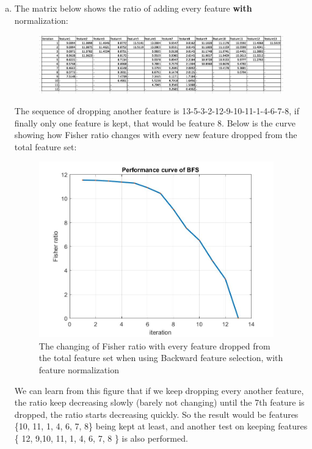 \documentclass[a4paper]{article}
\begin{document}
\begin{spacing}{2.0}
\begin{enumerate}[(1)]
\begin{itemize}
\begin{enumerate}[(a)]
\item \large{The matrix below shows the ratio of adding every feature \textbf{with} normalization:}
\normalsize
\begin{figure}[H]
\centering
\includegraphics[width = 7.5in]{NormalizetableBFS.jpg}
\label{BFSnorm}
\end{figure}

The sequence of dropping another feature is 13-5-3-2-12-9-10-11-1-4-6-7-8, if finally only one feature is kept, that would be feature 8.
Below is the curve showing how Fisher ratio changes with every new feature dropped from the total feature set:
\begin{figure}[H]
\centering
\includegraphics[width = 4in]{BFSnorm.jpg}
\caption{The changing of Fisher ratio with every feature dropped from the total feature set when using Backward feature selection, with feature normalization}
\end{figure}

We can learn from this figure that if we keep dropping every another feature, the ratio keep decreasing slowly (barely not changing) until the 7th feature is dropped, the ratio starts decreasing quickly. So the result would be features \{10, 11, 1, 4, 6, 7, 8\} being kept at least, and another test on keeping features \{ 12, 9,10, 11, 1, 4, 6, 7, 8 \} is also performed.


\end{enumerate}
\end{itemize}
\end{enumerate}
\end{spacing}
\end{document}
